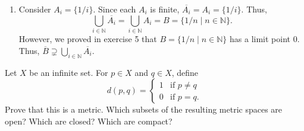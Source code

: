 \documentclass[12 pt, letterpaper]{hmcpset}
\begin{document}
\begin{solution}
\begin{enumerate}
			This contradicts the fact that $x$ is a limit point of $B_{n}$. Thus our assumption that there exists $x \in \overline{B_{n}}$ such that $x \notin \bigcup_{i = 1}^{n} \overline{A_{i}}$ was false. That is,
			\[
				\overline{B_{n}} \subset \bigcup_{i = 1}^{n} \overline{A_{i}}.
			\]
			Then by double inclusion
			\[
				\overline{B_{n}} = \bigcup_{i = 1}^{n} \overline{A_{i}}.
			\]
		\item Consider $A_{i} = \{ 1/i \}$. Since each $A_{i}$ is finite, $\overline{A_{i}} = A_{i} = \{ 1/i \}$. Thus,
			\[
				\bigcup_{i \in \mathbb{N}} \overline{A_{i}} = \bigcup_{i \in \mathbb{N}} A_{i} = B = \{ 1/n \mid n \in \mathbb{N} \}.
			\]
			However, we proved in exercise 5 that $B = \{ 1/n \mid n \in \mathbb{N} \}$ has a limit point $0$. Thus, $\overline{B} \supsetneq \bigcup_{i \in \mathbb{N}} \overline{A_{i}}$.
	\end{enumerate}
\end{solution}

\pagebreak

\begin{problem}
	Let $X$ be an infinite set. For $p \in X$ and $q \in X$, define
	\[
		d(p, q) = \begin{cases}
			1 & \text{if } p \neq q \\
			0 & \text{if } p = q.
		\end{cases}
	\]
	Prove that this is a metric. Which subsets of the resulting metric spaces are open? Which are closed? Which are compact?
\end{problem}
\end{document}
